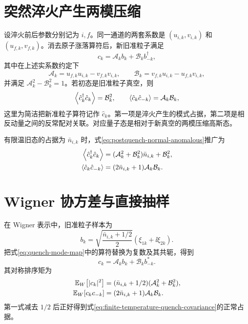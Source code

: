 \section{突然淬火产生两模压缩}

设淬火前后参数分别记为 $i,f$。同一通道的两套系数是
$(u_{i,k},v_{i,k})$ 和 $(u_{f,k},v_{f,k})$。消去原子涨落算符后，新旧准粒子满足
\begin{equation}
  c_k=\mathcal A_k b_k+\mathcal B_k b_{-k}^\dagger,
  \label{eq:quench-mode-map}
\end{equation}
其中在上述实系数约定下
\begin{equation}
  \mathcal A_k=u_{f,k}u_{i,k}-v_{f,k}v_{i,k},
  \qquad
  \mathcal B_k=v_{f,k}u_{i,k}-u_{f,k}v_{i,k},
  \label{eq:quench-ab-coefficients}
\end{equation}
并满足 $\mathcal A_k^2-\mathcal B_k^2=1$。若初态是旧准粒子真空，则
\begin{equation}
  \left\langle \hat c_k^\dagger\hat c_k\right\rangle=\mathcal B_k^2,
  \qquad
  \left\langle \hat c_k\hat c_{-k}\right\rangle=\mathcal A_k\mathcal B_k,
  \label{eq:postquench-normal-anomalous}
\end{equation}
这里为简洁把新准粒子算符记作 $\hat c_k$。第一项是淬火产生的模式占据，第二项是相反动量之间的反常配对关联。对应量子态是相对于新真空的两模压缩高斯态。

有限温旧态的占据为 $\bar n_{i,k}$ 时，式\eqref{eq:postquench-normal-anomalous}推广为
\begin{align}
  \left\langle \hat c_k^\dagger\hat c_k\right\rangle
  &=(\mathcal A_k^2+\mathcal B_k^2)\bar n_{i,k}+\mathcal B_k^2,\\
  \left\langle \hat c_k\hat c_{-k}\right\rangle
  &=(2\bar n_{i,k}+1)\mathcal A_k\mathcal B_k.
  \label{eq:finite-temperature-quench-covariance}
\end{align}

\section{Wigner 协方差与直接抽样}

在 Wigner 表示中，旧准粒子样本为
\begin{equation}
  b_k=\sqrt{\frac{\bar n_{i,k}+1/2}{2}}
  (\xi_{1k}+\ii\xi_{2k}).
  \label{eq:old-mode-wigner-sample}
\end{equation}
把式\eqref{eq:quench-mode-map}中的算符替换为复数及其共轭，得到
\begin{equation}
  c_k=\mathcal A_k b_k+\mathcal B_k b_{-k}^*.
  \label{eq:new-mode-wigner-sample}
\end{equation}
其对称排序矩为
\begin{align}
  \mathbb{E}_{W}\!\left[|c_k|^2\right]
  &=(\bar n_{i,k}+1/2)(\mathcal A_k^2+\mathcal B_k^2),\\
  \mathbb{E}_{W}\!\left[c_kc_{-k}\right]
  &=(2\bar n_{i,k}+1)\mathcal A_k\mathcal B_k.
  \label{eq:new-mode-wigner-covariance}
\end{align}
第一式减去 $1/2$ 后正好得到式\eqref{eq:finite-temperature-quench-covariance}的正常占据。

